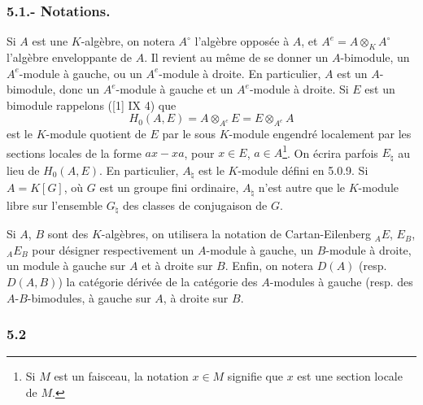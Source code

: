 \subsubsection*{5.1.- Notations.}

Si $A$ est une $K$-algèbre, on notera $A^\circ$ l'algèbre opposée à $A$, et $A^e=A\otimes_KA^\circ$ l'algèbre enveloppante de $A$. Il revient au même de se donner un $A$-bimodule, un $A^e$-module à gauche, ou un $A^e$-module à droite. En particulier, $A$ est un $A$-bimodule, donc un $A^e$-module à gauche et un $A^e$-module à droite. Si $E$ est un bimodule rappelons ([1] IX 4) que
\[
H_0(A,E)=A\otimes_{A^e}E=E\otimes_{A^e}A
\]
est le $K$-module quotient de $E$ par le sous $K$-module engendré localement par les sections locales de la forme $ax-xa$, pour $x\in E$, $a\in A$\footnote{Si $M$ est un faisceau, la notation $x\in M$ signifie que $x$ est une section locale de $M$.}. On écrira parfois $E_\natural$ au lieu de $H_0(A,E)$. En particulier, $A_\natural$ est le $K$-module défini en 5.0.9. Si $A=K[G]$, où $G$ est un groupe fini ordinaire, $A_\natural$ n'est autre que le $K$-module libre sur l'ensemble $G_\natural$ des classes de conjugaison de $G$.

Si $A$, $B$ sont des $K$-algèbres, on utilisera la notation de Cartan-Eilenberg ${}_AE$, $E_B$, ${}_AE_B$ pour désigner respectivement un $A$-module à gauche, un $B$-module à droite, un module à gauche sur $A$ et à droite sur $B$. Enfin, on notera $D(A)$ (resp. $D(A,B)$) la catégorie dérivée de la catégorie des $A$-modules à gauche (resp. des $A$-$B$-bimodules, à gauche sur $A$, à droite sur $B$.

\subsubsection*{5.2}

